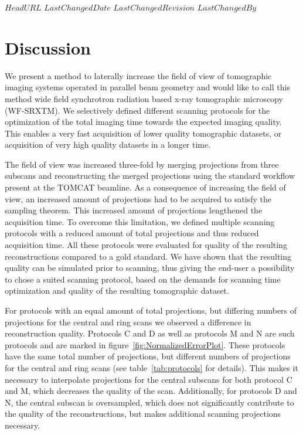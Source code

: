 \svnidlong
{$HeadURL$}
{$LastChangedDate$}
{$LastChangedRevision$}
{$LastChangedBy$}
%
\section{Discussion}\label{sec:Discussion}%

We present a method to laterally increase the field of view of tomographic imaging systems operated in parallel beam geometry and would like to call this method wide field synchrotron radiation based x-ray tomographic microscopy (WF-SRXTM). We selectively defined different scanning protocols for the optimization of the total imaging time towards the expected imaging quality. This enables a very fast acquisition of lower quality tomographic datasets, or acquisition of very high quality datasets in a longer time.

The field of view was increased three-fold by merging projections from three subscans and reconstructing the merged projections using the standard workflow present at the TOMCAT beamline. As a consequence of increasing the field of view, an increased amount of projections had to be acquired to satisfy the sampling theorem. This increased amount of projections lengthened the acquisition time. To overcome this limitation, we defined multiple scanning protocols with a reduced amount of total projections and thus reduced acquisition time. All these protocols were evaluated for quality of the resulting reconstructions compared to a gold standard. We have shown that the resulting quality can be simulated prior to scanning, thus giving the end-user a possibility to chose a suited scanning protocol, based on the demands for scanning time optimization and quality of the resulting tomographic dataset.

For protocols with an equal amount of total projections, but differing numbers of projections for the central and ring scans we observed a difference in reconstruction quality. Protocols C and D as well as protocols M and N are such protocols and are marked in figure~\ref{fig:NormalizedErrorPlot}. These protocols have the same total number of projections, but different numbers of projections for the central and ring scans (see table~\ref{tab:protocols} for details). This makes it necessary to interpolate projections for the central subscans for both protocol C and M, which decreases the quality of the scan. Additionally, for protocols D and N, the central subscan is oversampled, which does not significantly contribute to the quality of the reconstructions, but makes additional scanning projections necessary. 

